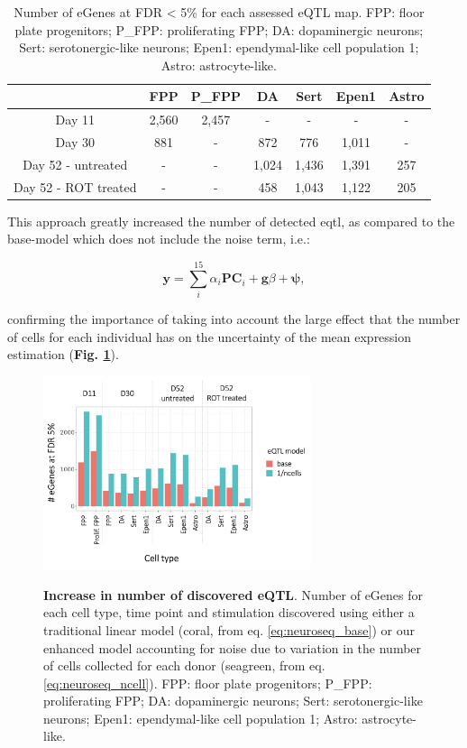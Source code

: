 \begin{table}[h]
    \centering
    \begin{tabular}{c|c c c c c c}
    &         FPP & P\_FPP & DA & Sert & Epen1 & Astro \\
    \hline
    Day 11  & 2,560 & 2,457 & - & - & - & - \\
    Day 30  & 881 & - &  872 & 776 & 1,011 & -  \\
    Day 52 - untreated & - & - & 1,024 & 1,436 & 1,391 & 257 \\
    Day 52 - ROT treated & - & -  & 458 & 1,043 & 1,122 & 205 \\
    \end{tabular}
    \caption[Number of eGenes across contexts]{Number of eGenes at FDR < 5\% for each assessed eQTL map.
    FPP: floor plate progenitors; P\_FPP: proliferating FPP; DA: dopaminergic neurons; Sert: serotonergic-like neurons; Epen1: ependymal-like cell population 1; Astro: astrocyte-like.}
    \label{tab:eqtl_results}
\end{table}

This approach greatly increased the number of detected \gls{eqtl}, as compared to the base-model which does not include the noise term, i.e.:

\begin{equation}\label{eq:neuroseq_base}
    \mathbf{y} = \sum_i^{15}\alpha_i \mathbf{PC}_i + \mathbf{g}\beta + \boldsymbol{\psi},
\end{equation}

confirming the importance of taking into account the large effect that the number of cells for each individual has on the uncertainty of the mean expression estimation (\textbf{Fig. \ref{fig:neuroseq_eqtl_improved_power}}). 

\begin{figure}
\caption[Increase in number of discovered eQTL]{\textbf{Increase in number of discovered eQTL}.
Number of eGenes for each cell type, time point and stimulation discovered using either a traditional linear model (coral, from eq. \eqref{eq:neuroseq_base}) or our enhanced model accounting for noise due to variation in the number of cells collected for each donor (seagreen, from eq. \eqref{eq:neuroseq_ncell}).
FPP: floor plate progenitors; P\_FPP: proliferating FPP; DA: dopaminergic neurons; Sert: serotonergic-like neurons; Epen1: ependymal-like cell population 1; Astro: astrocyte-like.}
\includegraphics[width=0.7\textwidth]{Chapter5/Fig/neuroseq_improved_eqtl_power.png}
\label{fig:neuroseq_eqtl_improved_power}
\end{figure}


